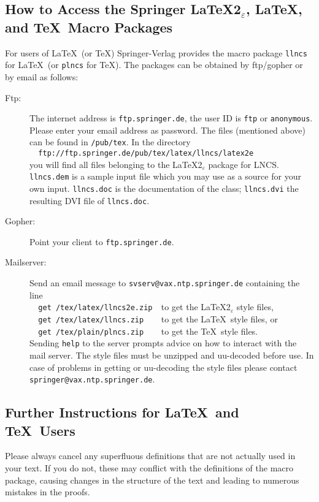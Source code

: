 \documentclass[a4paper]{llncs}
\begin{document}
\subsection{How to Access the Springer \LaTeX2$_\varepsilon$,
\LaTeX,\\and \TeX\ Macro Packages}

For users of \LaTeX\ (or \TeX) Springer-Verlag provides the macro
package \verb+llncs+ for \LaTeX\ (or \verb+plncs+ for \TeX). The
packages can be obtained by ftp/gopher or by email as follows:

\begin{description}
\item[Ftp:]
The internet address is \verb+ftp.springer.de+, the user ID is
\verb+ftp+ or \verb+anonymous+. Please enter your email address as
password. The files (mentioned above) can be found in \verb+/pub/tex+.
In the directory\\
\verb+  ftp://ftp.springer.de/pub/tex/latex/llncs/latex2e+\\
you will find all files belonging to the \LaTeX2$_\varepsilon$ package
for LNCS.
\verb+llncs.dem+ is a sample input file which you
may use as a source for your own input. \verb+llncs.doc+ is the
documentation of the class; \verb+llncs.dvi+ the resulting DVI file of
\verb+llncs.doc+.
\item[Gopher:]
Point your client to \verb+ftp.springer.de+.
\item[Mailserver:]
Send an email message to
\verb+svserv@vax.ntp.springer.de+  containing the line\\
\verb+  get /tex/latex/llncs2e.zip  +to get the
\LaTeX2$_\varepsilon$ style files,\\
\verb+  get /tex/latex/llncs.zip    +to get the \LaTeX\
style files, or\\
\verb+  get /tex/plain/plncs.zip    +to get the \TeX\
style files.\\
Sending \verb+help+ to the server prompts advice on how
to interact with the mail server. The style files must be unzipped and
uu-decoded before use. In case of problems in getting or uu-decoding the
style files please contact \verb+springer@vax.ntp.springer.de+.
\end{description}

\subsection{Further Instructions for \LaTeX\ and \TeX\ Users}

Please always cancel any superfluous definitions that are
not actually used in your text. If you do not, these may conflict with
the definitions of the macro package, causing changes in the structure
of the text and leading to numerous mistakes in the proofs.
\end{document}

